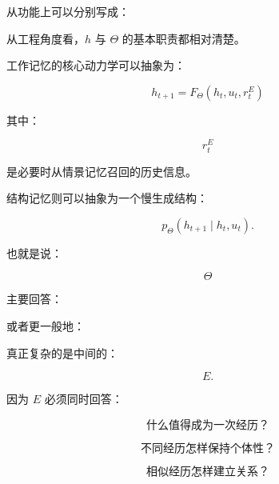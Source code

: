 从功能上可以分别写成：

\begin{statementbox}
\centering
{}
\end{statementbox}

\begin{statementbox}
\centering
{}
\end{statementbox}

\begin{statementbox}
\centering
{}
\end{statementbox}

从工程角度看，\(h\) 与 \(\Theta\) 的基本职责都相对清楚。

工作记忆的核心动力学可以抽象为：

\[
\boxed{
h_{t+1}
=
F_{\Theta}
\left(
h_t,
u_t,
r_t^E
\right)
}
\]

其中：

\[
r_t^E
\]

是必要时从情景记忆召回的历史信息。

结构记忆则可以抽象为一个慢生成结构：

\[
\boxed{
p_{\Theta}
\left(
h_{t+1}
\mid
h_t,u_t
\right).
}
\]

也就是说：

\[
\Theta
\]

主要回答：

\begin{statementbox}
\centering
{}
\end{statementbox}

或者更一般地：

\begin{statementbox}
\centering
{}
\end{statementbox}

真正复杂的是中间的：

\[
E.
\]

因为 \(E\) 必须同时回答：

\[
\text{什么值得成为一次经历？}
\]

\[
\text{不同经历怎样保持个体性？}
\]

\[
\text{相似经历怎样建立关系？}
\]

